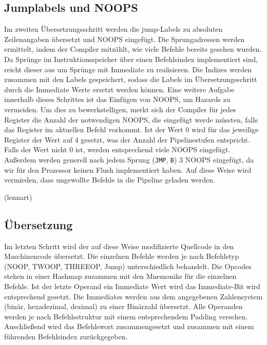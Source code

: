 \documentclass[paper=a4,fontsize=12pt,twocolumn]{scrreprt}
\begin{document}
\subsection{Jumplabels und NOOPS}
Im zweiten Übersetzungsschritt werden die jump-Labels zu absoluten Zeilenangaben übersetzt und NOOPS eingefügt.
Die Sprungadressen werden ermittelt, indem der Compiler mitzählt, wie viele Befehle bereits gesehen wurden.
Da Sprünge im Instruktionsspeicher über einen Befehlsindex implementiert sind, reicht dieser aus um Sprünge mit Immediate zu realisieren.
Die Indizes werden zusammen mit den Labels gespeichert, sodass die Labels im Übersetzungsschritt durch die Immediate Werte ersetzt werden können.
Eine weitere Aufgabe innerhalb dieses Schrittes ist das Einfügen von NOOPS, um Hazards zu vermeiden.
Um dies zu bewerkstelligen, merkt sich der Compiler für jedes Register die Anzahl der notwendigen NOOPS, die eingefügt werde müssten, falls das Register im aktuellen Befehl vorkommt.
Ist der Wert 0 wird für das jeweilige Register der Wert auf 4 gesetzt, was der Anzahl der Pipelinestufen entspricht.
Falls der Wert nicht 0 ist, werden entsprechend viele NOOPS eingefügt.
Außerdem werden generell nach jedem Sprung (\texttt{JMP}, \texttt{B}) 3 NOOPS eingefügt, da wir für den Prozessor keinen Flush implementiert haben.
Auf diese Weise wird vermieden, dass ungewollte Befehle in die Pipeline geladen werden.

(lennart)

\subsection{Übersetzung}
Im letzten Schritt wird der auf diese Weise modifizierte Quellcode in den Maschinencode übersetzt.
Die einzelnen Befehle werden je nach Befehlstyp (NOOP, TWOOP, THREEOP, Jump) unterschiedlich behandelt.
Die Opcodes stehen in einer Hashmap zusammen mit den Mnemoniks für die einzelnen Befehle.
Ist der letzte Operand ein Immediate Wert wird das Immediate-Bit wird entsprechend gesetzt.
Die Immediates werden aus dem angegebenen Zahlensystem (binär, hexadezimal, dezimal) zu einer Binärzahl übersetzt.
Alle Operanden werden je nach Befehlsstruktur mit einem entsprechendem Padding versehen.
Anschließend wird das Befehlswort zusammengesetzt und zusammen mit einem führenden Befehlsindex zurückgegeben.
\end{document}
